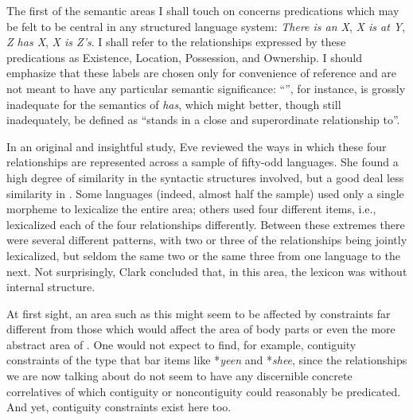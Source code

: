 The first of the semantic areas I shall touch on concerns predications which may be felt to be central in any structured language system: \textit{There is an X}, \textit{X is at Y}, \textit{Z has X}, \textit{X is Z's}. I shall refer to the relationships expressed by these predications as Existence, Location, Possession, and Ownership. I should emphasize that these labels are chosen only for convenience of reference and are not meant to have any particular semantic significance: ``'', for instance, is grossly inadequate for the semantics of \textit{has}, which might better, though still inadequately, be defined as ``stands in a close and superordinate relationship to''.

In an original and insightful study, Eve \citet{Clark1970} reviewed the ways in which these four relationships are represented across a sample of fifty-odd languages. She found a high degree of similarity in the syntactic structures involved, but a good deal less similarity in . Some languages (indeed, almost half the sample) used only a single morpheme to lexicalize the entire area; others used four different items, i.e., lexicalized each of the four relationships differently. Between these extremes there were several different patterns, with two or three of the relationships being jointly lexicalized, but seldom the same two or the same three from one language to the next. Not surprisingly, Clark concluded that, in this area, the lexicon was without internal structure.

At first sight, an area such as this might seem to be affected by constraints far different from those which would affect the area of 
body parts or even the more abstract area of . One would not expect to find, for example, contiguity constraints of the type that bar items like *\textit{yeen} and *\textit{shee}, since the relationships we are now talking about do not seem to have any discernible concrete correlatives of which contiguity or noncontiguity could reasonably be predicated. And yet, contiguity constraints exist here too.

